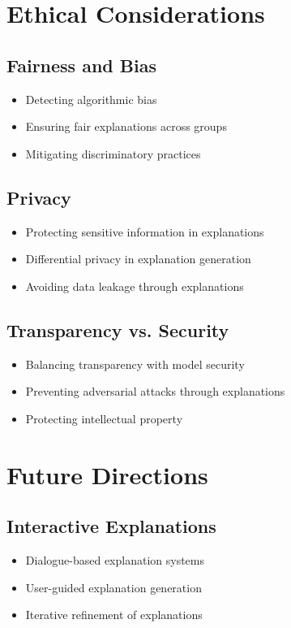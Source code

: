 \documentclass[11pt]{article}
\theoremstyle{definition}
\begin{document}
\section{Ethical Considerations}

\subsection{Fairness and Bias}
\begin{itemize}
    \item Detecting algorithmic bias
    \item Ensuring fair explanations across groups
    \item Mitigating discriminatory practices
\end{itemize}

\subsection{Privacy}
\begin{itemize}
    \item Protecting sensitive information in explanations
    \item Differential privacy in explanation generation
    \item Avoiding data leakage through explanations
\end{itemize}

\subsection{Transparency vs. Security}
\begin{itemize}
    \item Balancing transparency with model security
    \item Preventing adversarial attacks through explanations
    \item Protecting intellectual property
\end{itemize}

\section{Future Directions}

\subsection{Interactive Explanations}
\begin{itemize}
    \item Dialogue-based explanation systems
    \item User-guided explanation generation
    \item Iterative refinement of explanations
\end{itemize}
\end{document}
